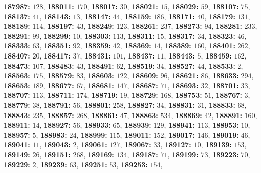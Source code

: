 \textsf{\bfseries 187987:} $128$, \textsf{\bfseries 188011:} $170$, \textsf{\bfseries 188017:} $30$, \textsf{\bfseries 188021:} $15$, \textsf{\bfseries 188029:} $59$, \textsf{\bfseries 188107:} $75$, \textsf{\bfseries 188137:} $41$, \textsf{\bfseries 188143:} $13$, \textsf{\bfseries 188147:} $44$, \textsf{\bfseries 188159:} $186$, \textsf{\bfseries 188171:} $40$, \textsf{\bfseries 188179:} $131$, \textsf{\bfseries 188189:} $114$, \textsf{\bfseries 188197:} $43$, \textsf{\bfseries 188249:} $123$, \textsf{\bfseries 188261:} $237$, \textsf{\bfseries 188273:} $94$, \textsf{\bfseries 188281:} $233$, \textsf{\bfseries 188291:} $99$, \textsf{\bfseries 188299:} $10$, \textsf{\bfseries 188303:} $113$, \textsf{\bfseries 188311:} $15$, \textsf{\bfseries 188317:} $34$, \textsf{\bfseries 188323:} $46$, \textsf{\bfseries 188333:} $63$, \textsf{\bfseries 188351:} $92$, \textsf{\bfseries 188359:} $42$, \textsf{\bfseries 188369:} $14$, \textsf{\bfseries 188389:} $160$, \textsf{\bfseries 188401:} $262$, \textsf{\bfseries 188407:} $20$, \textsf{\bfseries 188417:} $37$, \textsf{\bfseries 188431:} $101$, \textsf{\bfseries 188437:} $11$, \textsf{\bfseries 188443:} $5$, \textsf{\bfseries 188459:} $162$, \textsf{\bfseries 188473:} $107$, \textsf{\bfseries 188483:} $43$, \textsf{\bfseries 188491:} $62$, \textsf{\bfseries 188519:} $34$, \textsf{\bfseries 188527:} $44$, \textsf{\bfseries 188533:} $2$, \textsf{\bfseries 188563:} $175$, \textsf{\bfseries 188579:} $83$, \textsf{\bfseries 188603:} $122$, \textsf{\bfseries 188609:} $96$, \textsf{\bfseries 188621:} $86$, \textsf{\bfseries 188633:} $294$, \textsf{\bfseries 188653:} $189$, \textsf{\bfseries 188677:} $67$, \textsf{\bfseries 188681:} $147$, \textsf{\bfseries 188687:} $71$, \textsf{\bfseries 188693:} $32$, \textsf{\bfseries 188701:} $33$, \textsf{\bfseries 188707:} $113$, \textsf{\bfseries 188711:} $174$, \textsf{\bfseries 188719:} $19$, \textsf{\bfseries 188729:} $168$, \textsf{\bfseries 188753:} $51$, \textsf{\bfseries 188767:} $3$, \textsf{\bfseries 188779:} $38$, \textsf{\bfseries 188791:} $56$, \textsf{\bfseries 188801:} $258$, \textsf{\bfseries 188827:} $34$, \textsf{\bfseries 188831:} $31$, \textsf{\bfseries 188833:} $68$, \textsf{\bfseries 188843:} $235$, \textsf{\bfseries 188857:} $268$, \textsf{\bfseries 188861:} $47$, \textsf{\bfseries 188863:} $534$, \textsf{\bfseries 188869:} $42$, \textsf{\bfseries 188891:} $160$, \textsf{\bfseries 188911:} $14$, \textsf{\bfseries 188927:} $56$, \textsf{\bfseries 188933:} $65$, \textsf{\bfseries 188939:} $129$, \textsf{\bfseries 188941:} $113$, \textsf{\bfseries 188953:} $10$, \textsf{\bfseries 188957:} $5$, \textsf{\bfseries 188983:} $24$, \textsf{\bfseries 188999:} $115$, \textsf{\bfseries 189011:} $152$, \textsf{\bfseries 189017:} $146$, \textsf{\bfseries 189019:} $46$, \textsf{\bfseries 189041:} $11$, \textsf{\bfseries 189043:} $2$, \textsf{\bfseries 189061:} $127$, \textsf{\bfseries 189067:} $33$, \textsf{\bfseries 189127:} $10$, \textsf{\bfseries 189139:} $153$, \textsf{\bfseries 189149:} $26$, \textsf{\bfseries 189151:} $268$, \textsf{\bfseries 189169:} $134$, \textsf{\bfseries 189187:} $71$, \textsf{\bfseries 189199:} $73$, \textsf{\bfseries 189223:} $70$, \textsf{\bfseries 189229:} $2$, \textsf{\bfseries 189239:} $63$, \textsf{\bfseries 189251:} $53$, \textsf{\bfseries 189253:} $154$, 
